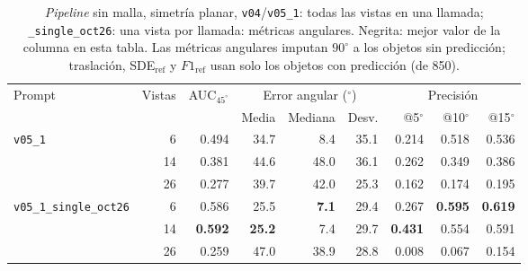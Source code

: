 
\begin{table}[htbp]
\centering
\caption{\textit{Pipeline} sin malla, simetría planar, \texttt{v04}/\texttt{v05\_1}: todas las vistas en una llamada; \texttt{\_single\_oct26}: una vista por llamada: métricas angulares. Negrita: mejor valor de la columna en esta tabla. Las métricas angulares imputan $90^\circ$ a los objetos sin predicción; traslación, SDE$_{\mathrm{ref}}$ y $F1_{\mathrm{ref}}$ usan solo los objetos con predicción (de 850).}
\label{tab:plane_modo_envio_angular}
\begin{adjustbox}{max width=\textwidth}
\begin{tabular}{lrrrrrrrr}
\toprule
\multirow{2}{*}{Prompt} & \multirow{2}{*}{Vistas} & \multirow{2}{*}{AUC$_{45^\circ}$} & \multicolumn{3}{c}{Error angular ($^\circ$)} & \multicolumn{3}{c}{Precisión} \\
\cmidrule(lr){4-6} \cmidrule(lr){7-9}
 &  &  & Media & Mediana & Desv. & @5$^\circ$ & @10$^\circ$ & @15$^\circ$ \\
\midrule
\multirow{3}{*}{\texttt{v05\_1}} & 6 & 0.494 & 34.7 & 8.4 & 35.1 & 0.214 & 0.518 & 0.536 \\
 & 14 & 0.381 & 44.6 & 48.0 & 36.1 & 0.262 & 0.349 & 0.386 \\
 & 26 & 0.277 & 39.7 & 42.0 & 25.3 & 0.162 & 0.174 & 0.195 \\
\midrule
\multirow{3}{*}{\texttt{v05\_1\_single\_oct26}} & 6 & 0.586 & 25.5 & \textbf{7.1} & 29.4 & 0.267 & \textbf{0.595} & \textbf{0.619} \\
 & 14 & \textbf{0.592} & \textbf{25.2} & 7.4 & 29.7 & \textbf{0.431} & 0.554 & 0.591 \\
 & 26 & 0.259 & 47.0 & 38.9 & 28.8 & 0.008 & 0.067 & 0.154 \\
\bottomrule
\end{tabular}
\end{adjustbox}
\end{table}

